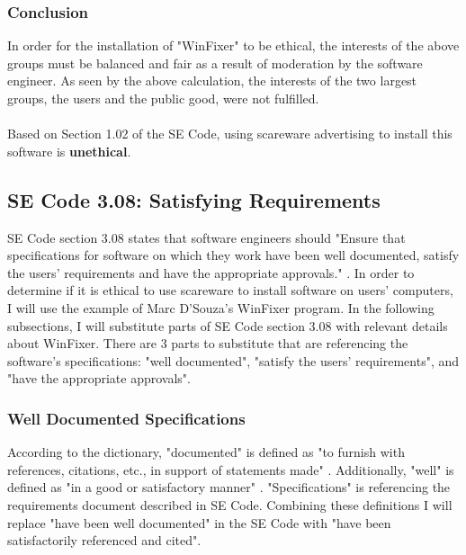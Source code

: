 \documentclass[11pt]{article}
\begin{document}
\begin{multicols}{2}
\subsubsection{Conclusion}
In order for the installation of "WinFixer" to be ethical, the interests of the above groups must be balanced and fair as a result of moderation by the software engineer. As seen by the above calculation, the interests of the two largest groups, the users and the public good, were not fulfilled.\\
\vspace{10pt}\\
Based on Section 1.02 of the SE Code, using scareware advertising to install this software is \textbf{unethical}.

\subsection{SE Code 3.08: Satisfying Requirements}
SE Code section 3.08 states that software engineers should "Ensure that specifications for software on which they work have been well documented, satisfy the users’ requirements and have the appropriate approvals." \cite{secode}. In order to determine if it is ethical to use scareware to install software on users' computers, I will use the example of Marc D'Souza's WinFixer program. In the following subsections, I will substitute parts of SE Code section 3.08 with relevant details about WinFixer. There are 3 parts to substitute that are referencing the software's specifications: "well documented", "satisfy the users' requirements", and "have the appropriate approvals".
\subsubsection{Well Documented Specifications}
According to the dictionary, "documented" is defined as "to furnish with references, citations, etc., in support of statements made" \cite{dictionary}. Additionally, "well" is defined as "in a good or satisfactory manner" \cite{dictionary}. "Specifications" is referencing the requirements document described in SE Code. Combining these definitions I will replace "have been well documented" in the SE Code with "have been satisfactorily referenced and cited".


\end{multicols}
\end{document}

